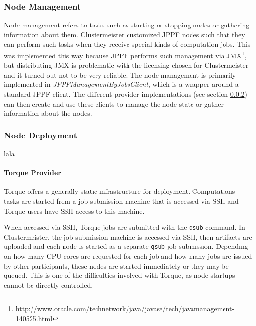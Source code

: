 \documentclass[12pt]{article}
\begin{document}
\subsubsection{Node Management}

Node management refers to tasks such as starting or stopping nodes or gathering information about them. Clustermeister customized JPPF nodes such that they can perform such tasks when they receive special kinds of computation jobs. This was implemented this way because JPPF performs such management via JMX\footnote{http://www.oracle.com/technetwork/java/javase/tech/javamanagement-140525.html}, but distributing JMX is problematic with the licensing chosen for Clustermeister and it turned out not to be very reliable. The node management is primarily implemented in \textit{JPPFManagementByJobsClient}, which is a wrapper around a standard JPPF client. The different provider implementations (see section \ref{deployment}) can then create and use these clients to manage the node state or gather information about the nodes.

\subsubsection{Node Deployment}
\label{deployment}
lala

\paragraph{Torque Provider}

\label{implementation-torque}

Torque offers a generally static infrastructure for deployment. Computations tasks are started from a job submission machine that is accessed via SSH and Torque users have SSH access to this machine.

When accessed via SSH, Torque jobs are submitted with the \texttt{qsub} command. In Clustermeister, the job submission machine is accessed via SSH, then artifacts are uploaded and each node is started as a separate \texttt{qsub} job submission. Depending on how many CPU cores are requested for each job and how many jobs are issued by other participants, these nodes are started immediately or they may be queued. This is one of the difficulties involved with Torque, as node startups cannot be directly controlled.
\end{document}
